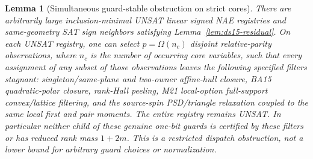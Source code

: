 \documentclass[11pt]{article}
\newtheorem{lemma}[theorem]{Lemma}
\begin{document}
\begin{lemma}[Simultaneous guard-stable obstruction on strict cores]\label{lem:ms21-guards}
There are arbitrarily large inclusion-minimal UNSAT linear signed NAE registries and same-geometry SAT sign neighbors satisfying Lemma~\ref{lem:ds15-residual}. On each UNSAT registry, one can select $p=\Omega(n_c)$ disjoint relative-parity observations, where $n_c$ is the number of occurring core variables, such that every assignment of any subset of those observations leaves the following specified filters stagnant: singleton/same-plane and two-owner affine-hull closure, BA15 quadratic-polar closure, rank-Hall peeling, M21 local-option full-support convex/lattice filtering, and the source-spin PSD/triangle relaxation coupled to the same local first and pair moments. The entire registry remains UNSAT. In particular neither child of these genuine one-bit guards is certified by these filters or has reduced rank mass $1+2m$. This is a restricted dispatch obstruction, not a lower bound for arbitrary guard choices or normalization.
\end{lemma}
\end{document}
